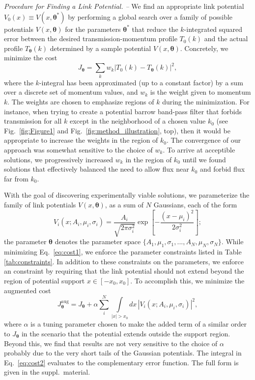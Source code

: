 \documentclass[twocolumn,amsmath,amssymb,showpacs,prl,superscriptaddress,aps]{revtex4-1}
\begin{document}
{\it Procedure for Finding a Link Potential. --}
We find an appropriate link potential $V_0(x) \equiv V(x,\bm{\theta}^*)$ by performing a global search over a family of possible potentials $V(x,\bm{\theta})$ for the parameters $\bm{\theta}^*$ that reduce the $k$-integrated squared error between the desired transmission-momentum profile $T_0(k)$ and the actual profile $T_{\bm\theta}(k)$ determined by a sample potential $V(x, \bm{\theta})$. Concretely, we minimize the cost
\begin{equation}\label{eq:cost1}
  J_{\bm{\theta}} = \sum_kw_k\left|T_0(k) - T_{\bm{\theta}}(k)\right|^2,
\end{equation}
where the $k$-integral has been approximated (up to a constant factor) by a sum over a discrete set of momentum values, and $w_k$ is the weight given to momentum $k$. The weights are chosen to emphasize regions of $k$ during the minimization. For instance, when trying to create a potential barrow band-pass filter that forbids transmission for all $k$ except in the neighborhood of a chosen value $k_0$ (see Fig.~\ref{fig:Figure1} and Fig.~\ref{fig:method_illustration}, top), then it would be appropriate to increase the weights in the region of $k_0$. The convergence of our approach was somewhat sensitive to the choice of $w_k$. To arrive at acceptible solutions, we progressively increased $w_k$ in the region of $k_0$ until we found solutions that effectively balanced the need to allow flux near $k_0$ and forbid flux far from $k_0$. 

With the goal of discovering experimentally viable solutions, we parameterize the family of link potentials $V(x, \bm{\theta})$, as a sum of $N$ Gaussians, each of the form
\begin{equation}\label{eq:V-param}
V_i(x; A_i, \mu_i, \sigma_i) = \frac{A_i}{\sqrt{2\pi\sigma_i^2}}\exp\left[{-\frac{(x-\mu_i)^2}{2\sigma_i^2}}\right];
\end{equation}
the parameter $\bm{\theta}$ denotes the parameter space $\{A_1, \mu_1, \sigma_1,...,A_N, \mu_N, \sigma_N\}$. While minimizing Eq.~\eqref{eq:cost1}, we enforce the parameter constraints listed in Table \ref{tab:constraints}. In addition to these constraints on the parameters, we enforce an constraint by requiring that the link potential should not extend beyond the region of potential support $x\in[-x_0,x_0]$. 
To accomplish this, we minimize the augmented cost
\begin{equation}\label{eq:cost2}
  J_{\bm{\theta}}^{\mathrm{aug}} = J_{\bm{\theta}} + \alpha \sum_i^N\int\limits_{|x|>x_0}dx\,|V_i(x; A_i,\mu_i,\sigma_i)|^2,
\end{equation}
where $\alpha$ is a tuning parameter chosen to make the added term of a similar order to $J_{\mathbf{\theta}}$ in the scenario that the potential extends outside the support region. Beyond this, we find that results are not very sensitive to the choice of $\alpha$ probably due to the very short tails of the Gaussian potentials. The integral in Eq.~\eqref{eq:cost2} evaluates to the complementary error function. The full form is given in the suppl.~material. 
\end{document}

